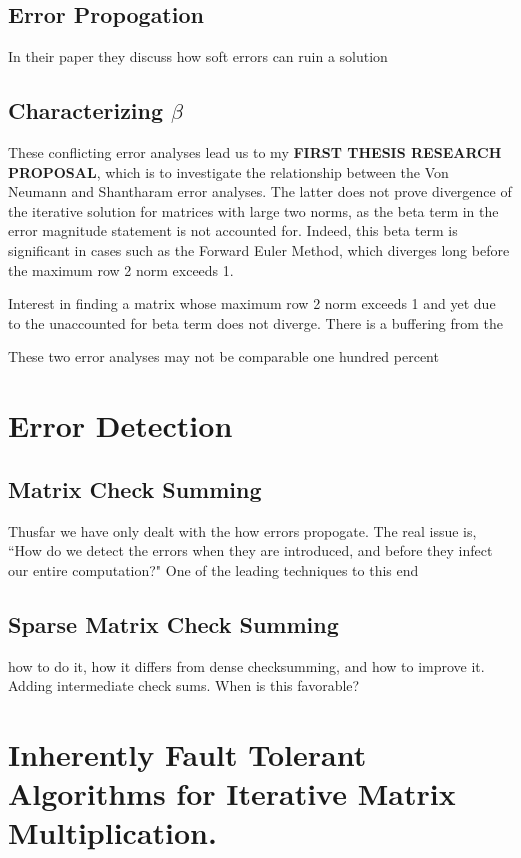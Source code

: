 \documentclass[a4paper]{article}
\begin{document}
\subsection{Error Propogation}
In their paper they discuss how soft errors can ruin a solution
\subsection{Characterizing $\beta$}
These conflicting error analyses lead us to my \textbf{FIRST THESIS RESEARCH PROPOSAL}, which is to investigate the relationship between the Von Neumann and Shantharam error analyses. The latter does not prove divergence of the iterative solution for matrices with large two norms, as the beta term in the error magnitude statement is not accounted for. Indeed, this beta term is significant in cases such as the Forward Euler Method, which diverges long before the maximum row 2 norm exceeds 1. 

Interest in finding a matrix whose maximum row 2 norm exceeds 1 and yet due to the unaccounted for beta term does not diverge. There is a buffering from the 

These two error analyses may not be comparable one hundred percent 

\section{Error Detection}
\subsection{Matrix Check Summing}
Thusfar we have only dealt with the how errors propogate. The real issue is, ``How do we detect the errors when they are introduced, and before they infect our entire computation?" One of the leading techniques to this end 
\subsection{Sparse Matrix Check Summing}
how to do it, how it differs from dense checksumming, and how to improve it.
Adding intermediate check sums. When is this favorable?

\section{Inherently Fault Tolerant Algorithms for Iterative Matrix Multiplication.}
\end{document}
